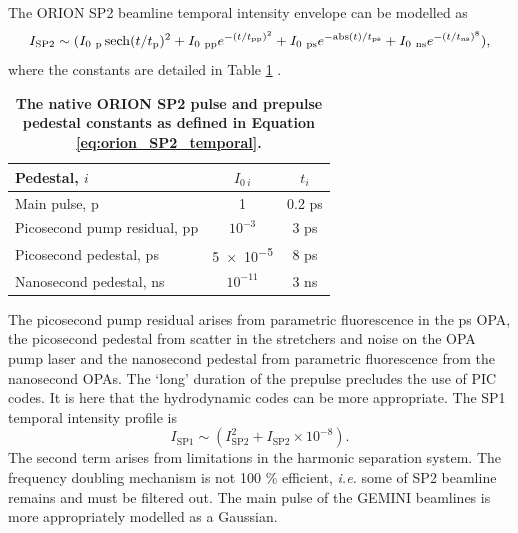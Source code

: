 The ORION SP2 beamline temporal intensity envelope can be modelled as
\begin{equation}\label{eq:orion_SP2_temporal}
	I_\mathrm{SP2} \sim (I_{0 \ \mathrm{p}}\sech(t/t_\mathrm{p})^2 + I_{0 \ \mathrm{pp}}e^{-(t/t_\mathrm{pp})^2} + I_{0 \ \mathrm{ps}}e^{-\mathrm{abs}(t)/t_\mathrm{ps}} + I_{0 \ \mathrm{ns}}e^{-(t/t_\mathrm{ns})^8}),
\end{equation}
where the constants are detailed in Table \ref{tab:orion_pedestals} \cite{dhillierModelORIONContrast22}.
\begin{table}[]
	\centering
	\begin{tabular}{lcc}
		\hline\hline
		Pedestal, $i$                & $I_{0 \ i}$ & $t_i$  \\ \hline
		Main pulse, p                & 1           & 0.2 ps \\
		Picosecond pump residual, pp & $10^{-3}$   & 3 ps   \\
		Picosecond pedestal, ps      & \num{5e-5}  & 8 ps   \\
		Nanosecond pedestal, ns      & $10^{-11}$  & 3 ns  \\ \hline \hline
	\end{tabular}
	\caption{\textbf{The native ORION SP2 pulse and prepulse pedestal constants as defined in Equation \ref{eq:orion_SP2_temporal}.}}
	\label{tab:orion_pedestals}
\end{table}
The picosecond pump residual arises from parametric fluorescence in the ps OPA, the picosecond pedestal from scatter in the stretchers and noise on the OPA pump laser and the nanosecond pedestal from parametric fluorescence from the nanosecond OPAs. The `long' duration of the prepulse precludes the use of PIC codes. It is here that the hydrodynamic codes can be more appropriate.
The SP1 temporal intensity profile is
\begin{equation}
	I_\mathrm{SP1} \sim (I_\mathrm{SP2}^2 + I_\mathrm{SP2} \times 10^{-8}).
\end{equation}
The second term arises from limitations in the harmonic separation system. The frequency doubling mechanism is not 100 \% efficient, \textit{i.e.} some of SP2 beamline remains and must be filtered out. The main pulse of the GEMINI beamlines is more appropriately modelled as a Gaussian.


